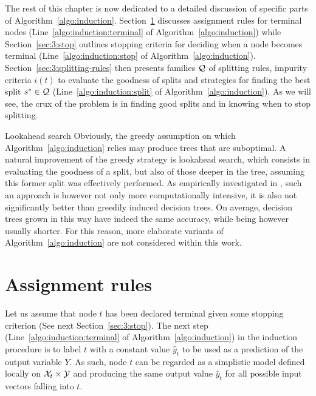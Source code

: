 The rest of this chapter is now dedicated to a detailed discussion of specific
parts of Algorithm~\ref{algo:induction}. Section~\ref{sec:3:assignment}
discusses assignment rules for terminal nodes
(Line~\ref{algo:induction:terminal} of Algorithm~\ref{algo:induction}) while
Section~\ref{sec:3:stop} outlines stopping criteria for deciding when a node
becomes terminal (Line~\ref{algo:induction:stop} of
Algorithm~\ref{algo:induction}). Section~\ref{sec:3:splitting-rules} then
presents families ${\cal Q}$ of splitting rules, impurity criteria $i(t)$ to
evaluate the goodness of splits and strategies for
finding the best split $s^* \in {\cal Q}$ (Line~\ref{algo:induction:split} of
Algorithm~\ref{algo:induction}). As we will see, the crux of the problem is in
finding good splits and in knowing when to stop splitting.

\begin{remark}{Lookahead search}
Obviously, the greedy assumption on which Algorithm~\ref{algo:induction} relies
may produce trees that are suboptimal. A natural improvement of the greedy
strategy is lookahead search, which consists in evaluating the
goodness of a split, but also of those deeper in the tree, assuming this former split was effectively performed. As empirically
investigated in \citep{murthy:1995}, such an approach is however not only more
computationally intensive, it is also not significantly better than greedily
induced decision trees. On average, decision trees grown in this way have
indeed the same accuracy, while being however usually shorter. For this reason,
more elaborate variants of Algorithm~\ref{algo:induction} are not considered
within this work.
\end{remark}

\section{Assignment rules}
\label{sec:3:assignment}

Let us assume that node $t$ has been declared terminal given some stopping
criterion (See next Section~\ref{sec:3:stop}). The next step
(Line~\ref{algo:induction:terminal} of Algorithm~\ref{algo:induction}) in the
induction procedure is to label $t$ with a constant value $\widehat{y}_t$ to
be used as a prediction of the output variable $Y$. As such, node $t$ can  be
regarded as a simplistic model defined locally on ${\cal X}_t \times {\cal Y}$
and producing the same output value $\widehat{y}_t$ for all possible input
vectors falling into $t$.

